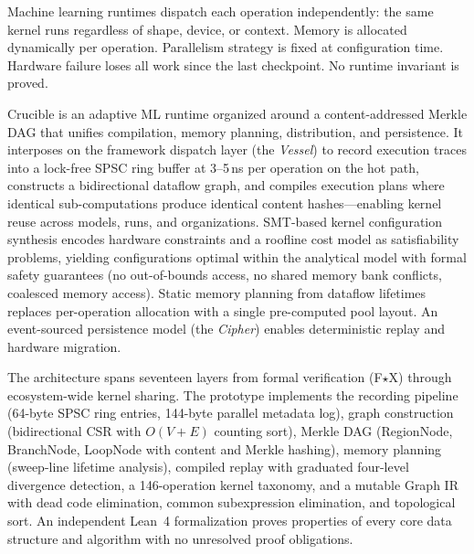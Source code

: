 
\noindent
Machine learning runtimes dispatch each operation independently: the same kernel runs regardless of shape, device, or context.
Memory is allocated dynamically per operation.
Parallelism strategy is fixed at configuration time.
Hardware failure loses all work since the last checkpoint.
No runtime invariant is proved.

Crucible is an adaptive ML runtime organized around a content-addressed Merkle DAG that unifies compilation, memory planning, distribution, and persistence.
It interposes on the framework dispatch layer (the \emph{Vessel}) to record execution traces into a lock-free SPSC ring buffer at 3--5\,ns per operation on the hot path, constructs a bidirectional dataflow graph, and compiles execution plans where identical sub-computations produce identical content hashes---enabling kernel reuse across models, runs, and organizations.
SMT-based kernel configuration synthesis encodes hardware constraints and a roofline cost model as satisfiability problems, yielding configurations optimal within the analytical model with formal safety guarantees (no out-of-bounds access, no shared memory bank conflicts, coalesced memory access).
Static memory planning from dataflow lifetimes replaces per-operation allocation with a single pre-computed pool layout.
An event-sourced persistence model (the \emph{Cipher}) enables deterministic replay and hardware migration.

The architecture spans seventeen layers from formal verification (F$\star$X) through ecosystem-wide kernel sharing.
The prototype implements the recording pipeline (64-byte SPSC ring entries, 144-byte parallel metadata log), graph construction (bidirectional CSR with $O(V{+}E)$ counting sort), Merkle DAG (RegionNode, BranchNode, LoopNode with content and Merkle hashing), memory planning (sweep-line lifetime analysis), compiled replay with graduated four-level divergence detection, a 146-operation kernel taxonomy, and a mutable Graph IR with dead code elimination, common subexpression elimination, and topological sort.
An independent Lean~4 formalization proves properties of every core data structure and algorithm with no unresolved proof obligations.
